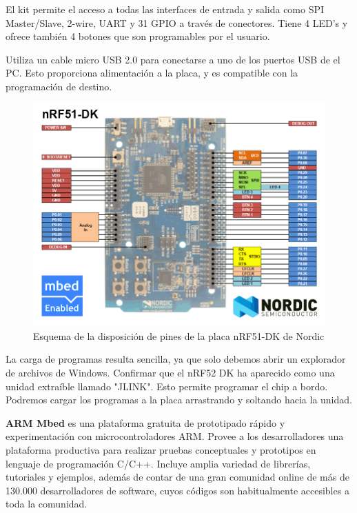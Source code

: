 El kit permite el acceso a todas las interfaces de entrada y salida como SPI Master/Slave, 2-wire, UART y 31 GPIO a través de conectores. Tiene 4 LED’s y ofrece también 4 botones que son programables por el usuario. 

Utiliza un cable micro USB 2.0 para conectarse a uno de los puertos USB de el PC. Esto proporciona alimentación a la placa, y es compatible con la programación de destino.

\begin{figure}[h]%
	\centering
    \includegraphics[scale=0.5]{figures/nRF51DK_pines.png} %

    \caption[Esquema de la disposición de pines de la placa nRF51-DK de Nordic]{Esquema de la disposición de pines de la placa nRF51-DK de Nordic}

   \label{figuraNordicNRF51}
\end{figure}

La  carga de programas resulta sencilla, ya que solo debemos abrir un explorador de archivos de Windows. Confirmar que el nRF52 DK ha aparecido como una unidad extraíble llamado "JLINK". Esto permite programar el chip a bordo. Podremos cargar los programas a la placa arrastrando y soltando hacia la unidad.

\textbf{ARM Mbed} es una plataforma gratuita de prototipado rápido y experimentación con microcontroladores ARM. Provee a los desarrolladores una plataforma productiva para realizar pruebas conceptuales y prototipos en lenguaje de programación C/C++. Incluye amplia variedad de librerías, tutoriales y ejemplos, además de contar de una gran comunidad online de más de 130.000 desarrolladores de software, cuyos códigos son habitualmente accesibles a toda la comunidad.

